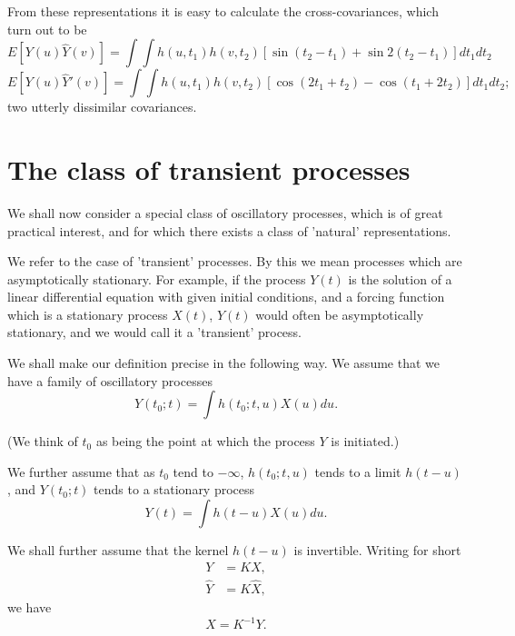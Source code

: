 \documentclass{article}
\begin{document}
From these representations it is easy to calculate the cross-covariances, which
turn out to be
\begin{equation}
\label{eq:cov1}
E[Y(u)\hat{Y}(v)] = \int \int h(u, t_1) h(v, t_2) [\sin(t_2-t_1) + \sin 2(t_2-t_1)]dt_1dt_2
\end{equation}
\begin{equation}
\label{eq:cov2}
E[Y(u)\hat{Y}'(v)] = \int \int h(u, t_1) h(v, t_2) [\cos(2t_1 + t_2) - \cos (t_1 + 2t_2)]dt_1dt_2;
\end{equation}
two utterly dissimilar covariances.

\section{The class of transient processes}

We shall now consider a special class of oscillatory processes, which is of great
practical interest, and for which there exists a class of 'natural' representations.

We refer to the case of 'transient' processes. By this we mean processes which
are asymptotically stationary. For example, if the process $Y(t)$ is the solution of
a linear differential equation with given initial conditions, and a forcing function
which is a stationary process $X(t)$, $Y(t)$ would often be asymptotically stationary, and we would call it a 'transient' process.

We shall make our definition precise in the following way. We assume that we
have a family of oscillatory processes
\begin{equation}
\label{eq:y_t0}
Y(t_0; t) = \int h(t_0; t, u)X(u)du.
\end{equation}

(We think of $t_0$ as being the point at which the process $Y$ is initiated.)

We further assume that as $t_0$ tend to $-\infty$, $h(t_0; t, u)$ tends to a limit $h(t - u)$,
and $Y(t_0; t)$ tends to a stationary process
\begin{equation}
\label{eq:y_stationary}
Y(t) = \int h(t-u)X(u)du.
\end{equation}

We shall further assume that the kernel $h(t-u)$ is invertible. Writing for
short
\begin{align}
Y &= KX, \label{eq:y_short} \\
\hat{Y} &= K\hat{X}, \label{eq:y_hat_short}
\end{align}
we have
\begin{equation}
\label{eq:x_from_y}
X = K^{-1}Y.
\end{equation}
\end{document}
